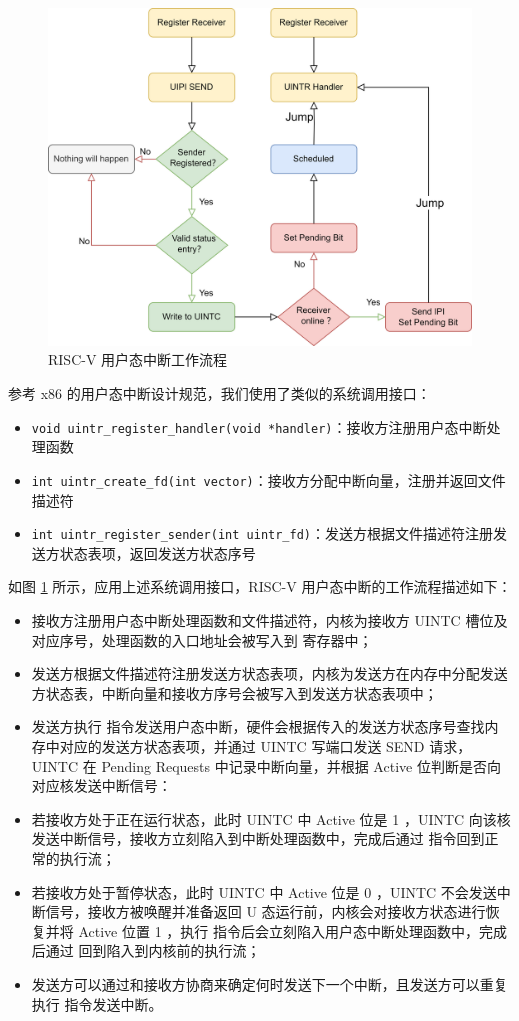 \begin{figure}
    \centering
    \includegraphics[width=0.8\linewidth]{figures/uintr2.png}
    \caption{RISC-V 用户态中断工作流程}
    \label{fig:uintr2}
\end{figure}

参考 x86 的用户态中断设计规范\cite{x86uintr}，我们使用了类似的系统调用接口：

\begin{itemize}
    \item \texttt{void uintr_register_handler(void *handler)}：接收方注册用户态中断处理函数
    \item \texttt{int uintr_create_fd(int vector)}：接收方分配中断向量，注册并返回文件描述符
    \item \texttt{int uintr_register_sender(int uintr_fd)}：发送方根据文件描述符注册发送方状态表项，返回发送方状态序号
\end{itemize}

如图 \ref{fig:uintr2} 所示，应用上述系统调用接口，RISC-V 用户态中断的工作流程描述如下：

\begin{itemize}
    \item[1.] 接收方注册用户态中断处理函数和文件描述符，内核为接收方 UINTC 槽位及对应序号，处理函数的入口地址会被写入到 \Rutvec 寄存器中；
    \item[2.] 发送方根据文件描述符注册发送方状态表项，内核为发送方在内存中分配发送方状态表，中断向量和接收方序号会被写入到发送方状态表项中；
    \item[3.] 发送方执行 \Iuipisend 指令发送用户态中断，硬件会根据传入的发送方状态序号查找内存中对应的发送方状态表项，并通过 UINTC 写端口发送 SEND 请求，UINTC 在 Pending Requests 中记录中断向量，并根据 Active 位判断是否向对应核发送中断信号：
    \item[4a.] 若接收方处于正在运行状态，此时 UINTC 中 Active 位是 1 ，UINTC 向该核发送中断信号，接收方立刻陷入到中断处理函数中，完成后通过 \Iuret 指令回到正常的执行流；
    \item[4b.] 若接收方处于暂停状态，此时 UINTC 中 Active 位是 0 ，UINTC 不会发送中断信号，接收方被唤醒并准备返回 U 态运行前，内核会对接收方状态进行恢复并将 Active 位置 1 ，执行 \Isret 指令后会立刻陷入用户态中断处理函数中，完成后通过 \Iuret 回到陷入到内核前的执行流；
    \item[5.] 发送方可以通过和接收方协商来确定何时发送下一个中断，且发送方可以重复执行 \Iuipisend 指令发送中断。 
\end{itemize}
